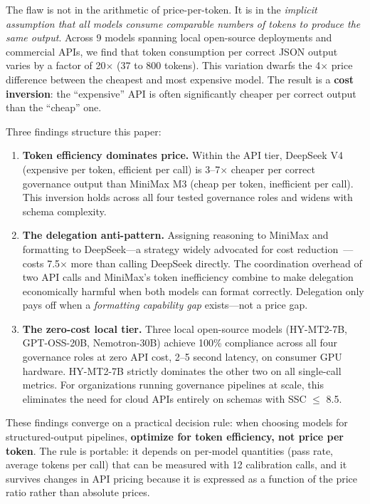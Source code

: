 \documentclass[11pt,a4paper]{article}
\begin{document}
The flaw is not in the arithmetic of price-per-token. It is in the \textit{implicit assumption that all models consume comparable numbers of tokens to produce the same output}. Across 9 models spanning local open-source deployments and commercial APIs, we find that token consumption per correct JSON output varies by a factor of 20$\times$ (37 to 800 tokens). This variation dwarfs the 4$\times$ price difference between the cheapest and most expensive model. The result is a \textbf{cost inversion}: the ``expensive'' API is often significantly cheaper per correct output than the ``cheap'' one.

Three findings structure this paper:

\begin{enumerate}[label=\textbf{F\arabic*:}, leftmargin=*]
\item \textbf{Token efficiency dominates price.} Within the API tier, DeepSeek V4 (expensive per token, efficient per call) is 3--7$\times$ cheaper per correct governance output than MiniMax M3 (cheap per token, inefficient per call). This inversion holds across all four tested governance roles and widens with schema complexity.

\item \textbf{The delegation anti-pattern.} Assigning reasoning to MiniMax and formatting to DeepSeek---a strategy widely advocated for cost reduction~\cite{fable5harness}---costs 7.5$\times$ more than calling DeepSeek directly. The coordination overhead of two API calls and MiniMax's token inefficiency combine to make delegation economically harmful when both models can format correctly. Delegation only pays off when a \textit{formatting capability gap} exists---not a price gap.

\item \textbf{The zero-cost local tier.} Three local open-source models (HY-MT2-7B, GPT-OSS-20B, Nemotron-30B) achieve 100\% compliance across all four governance roles at zero API cost, 2--5 second latency, on consumer GPU hardware. HY-MT2-7B strictly dominates the other two on all single-call metrics. For organizations running governance pipelines at scale, this eliminates the need for cloud APIs entirely on schemas with SSC $\leq$ 8.5.
\end{enumerate}

These findings converge on a practical decision rule: when choosing models for structured-output pipelines, \textbf{optimize for token efficiency, not price per token}. The rule is portable: it depends on per-model quantities (pass rate, average tokens per call) that can be measured with 12 calibration calls, and it survives changes in API pricing because it is expressed as a function of the price ratio rather than absolute prices.
\end{document}
